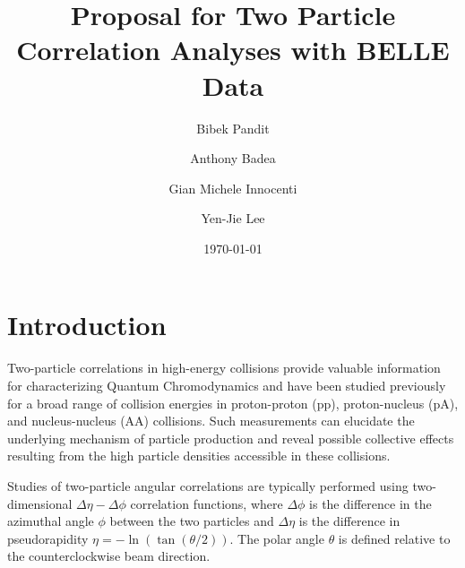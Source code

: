\documentclass[%
preprint,
 amsmath,amssymb,
 aps,
]{revtex4-1}
\begin{document}

\title{Proposal for Two Particle Correlation Analyses with BELLE Data}%

\author{Bibek Pandit}%
\author{Anthony Badea}%
\author{Gian Michele Innocenti}%
\author{Yen-Jie Lee}


\date{\today}%

\begin{abstract}

\end{abstract}

\maketitle


\section{Introduction}

Two-particle correlations in high-energy collisions provide valuable information for characterizing Quantum Chromodynamics and have been studied previously for a broad range of collision energies in proton-proton (pp), proton-nucleus (pA), and nucleus-nucleus (AA) collisions. Such measurements can elucidate the underlying mechanism of particle production and reveal possible collective effects resulting from the high particle densities accessible in these collisions.

Studies of two-particle angular correlations are typically performed using two-dimensional $\Delta\eta-\Delta\phi$ correlation functions, where $\Delta\phi$ is the difference in the azimuthal angle $\phi$ between the two particles and $\Delta\eta$ is the difference in pseudorapidity $\eta = -\ln(\tan(\theta/2))$. The polar angle $\theta$ is defined relative to the counterclockwise beam direction.
\end{document}
